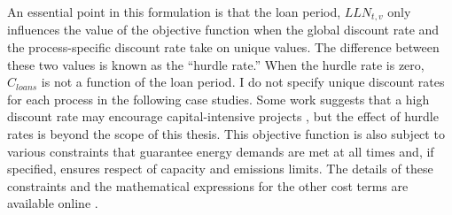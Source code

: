 An essential point in this formulation is that the loan period, $LLN_{t,v}$ only
influences the value of the objective function when the global discount rate
and the process-specific discount rate take on unique values. The difference between
these two values is known as the ``hurdle rate.'' When the hurdle rate is zero,
$C_{loans}$ is not a function of the loan period. I
do not specify unique discount rates for each process in the following case studies.
Some work suggests that a high discount rate may encourage capital-intensive projects \cite{alzbutas_uncertainty_2012,
decarolis_modelling_2016}, but the effect of hurdle rates is beyond the scope of
this thesis. This objective function is also subject to various constraints that
guarantee energy demands are met at all times and, if specified, ensures respect
of capacity and emissions limits. The details of these constraints and the
mathematical expressions for the other cost terms are available online
\cite{decarolis_preface_nodate}.

